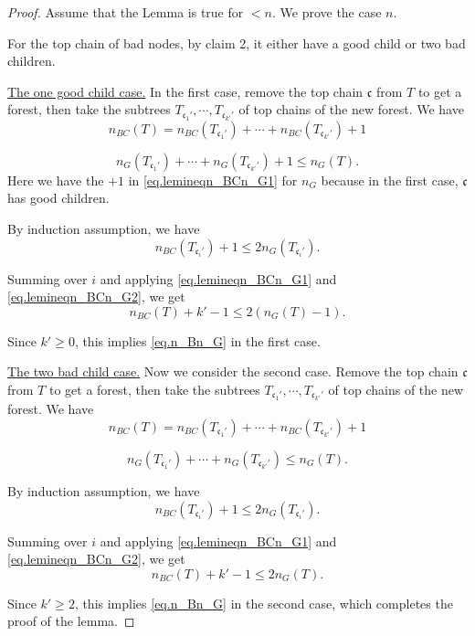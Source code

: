 \begin{proof}
Assume that the Lemma is true for $<n$. We prove the case $n$. 


For the top chain of bad nodes, by claim 2, it either have a good child or two bad children.

\underline{The one good child case.} In the first case, remove the top chain $\mathfrak{c}$ from $T$ to get a forest, then take the subtrees $T_{\mathfrak{c}_1'},\cdots, T_{\mathfrak{c}_{k'}'}$ of top chains of the new forest. We have 
\begin{equation}\label{eq.lemineqn_BCn_G1}
 n_{BC}(T) = n_{BC}(T_{\mathfrak{c}_1'}) + \cdots + n_{BC}(T_{\mathfrak{c}_{k'}'}) + 1
\end{equation}

\begin{equation}\label{eq.lemineqn_BCn_G2}
 n_{G}(T_{\mathfrak{c}_1'}) + \cdots + n_{G}(T_{\mathfrak{c}_{k'}'}) + 1\le n_{G}(T).
\end{equation}
Here we have the $+1$ in \eqref{eq.lemineqn_BCn_G1} for $n_{G}$ because in the first case, $\mathfrak{c}$ has good children.

By induction assumption, we have
\begin{equation}
 n_{BC}(T_{\mathfrak{c}_i'}) + 1 \le 2n_{G}(T_{\mathfrak{c}_i'}).
\end{equation}

Summing over $i$ and applying \eqref{eq.lemineqn_BCn_G1} and \eqref{eq.lemineqn_BCn_G2}, we get 
\begin{equation}
 n_{BC}(T) + k'-1 \le 2(n_{G}(T)-1).
\end{equation}

Since $k'\ge 0$, this implies \eqref{eq.n_Bn_G} in the first case.

\underline{The two bad child case.} Now we consider the second case. Remove the top chain $\mathfrak{c}$ from $T$ to get a forest, then take the subtrees $T_{\mathfrak{c}_1'},\cdots, T_{\mathfrak{c}_{k'}'}$ of top chains of the new forest. We have 
\begin{equation}\label{eq.lemineqn_BCn_G3}
 n_{BC}(T) = n_{BC}(T_{\mathfrak{c}_1'}) + \cdots + n_{BC}(T_{\mathfrak{c}_{k'}'}) + 1
\end{equation}

\begin{equation}\label{eq.lemineqn_BCn_G4}
 n_{G}(T_{\mathfrak{c}_1'}) + \cdots + n_{G}(T_{\mathfrak{c}_{k'}'})\le n_{G}(T).
\end{equation}

By induction assumption, we have
\begin{equation}
 n_{BC}(T_{\mathfrak{c}_i'}) + 1 \le 2n_{G}(T_{\mathfrak{c}_i'}).
\end{equation}

Summing over $i$ and applying \eqref{eq.lemineqn_BCn_G1} and \eqref{eq.lemineqn_BCn_G2}, we get 
\begin{equation}
 n_{BC}(T) + k' - 1 \le 2n_{G}(T).
\end{equation}

Since $k'\ge 2$, this implies \eqref{eq.n_Bn_G} in the second case, which completes the proof of the lemma.
\end{proof}


